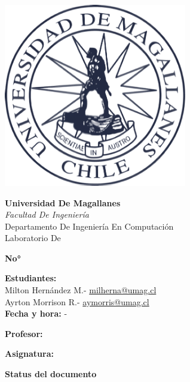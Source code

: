 \begin{titlepage}
    \centering
    \begin{center}
        \begin{minipage}[c]{0.3\textwidth}
            \centering
            \includegraphics[width=0.6\textwidth]{src/images/logoUmag.png}
        \end{minipage}\hfill
        \begin{minipage}[c]{0.7\textwidth}
            \centering
            \textbf{Universidad De Magallanes}\\
            \textit{Facultad De Ingeniería}\\
            Departamento De Ingeniería En Computación\\
            Laboratorio De \docsubject\\
        \end{minipage}
    \end{center}
    \vspace{0.2cm}
    {\LARGE\bfseries\doctype No° \docnumber\par}
    {\large \doctitle \par}
    \vspace{1.5cm}
    {\large \textbf{Estudiantes:} \\
    Milton Hernández M.- \href{mailto:milherna@umag.cl}{milherna@umag.cl}\\
    Ayrton Morrison R.- \href{mailto:aymorris@umag.cl}{aymorris@umag.cl}\\}
    \vspace{0.3cm}
    \textbf{Fecha y hora:} {\docdate - \doctime} \\
    \vspace{0.3cm}
    {\large \textbf{Profesor:} \docprofessor \par}
    \vspace{0.3cm}
    {\large \textbf{Asignatura:} \docsubject \par}
    \vspace{1.5cm}
    {\LARGE\bfseries Status del documento \par}
    
    \vfill
\end{titlepage}